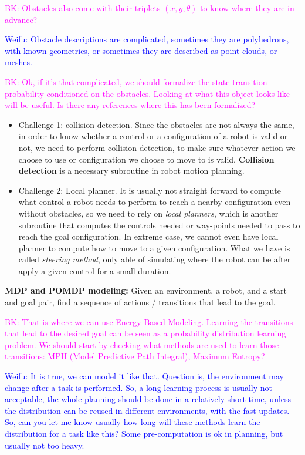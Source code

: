 \documentclass{article}
\begin{document}
\textcolor{magenta}{BK: Obstacles also come with their triplets $(x, y, \theta)$ to know where they are in advance?}

\textcolor{blue}{Weifu: Obstacle descriptions are complicated, sometimes they are polyhedrons, with known geometries, or sometimes they are described as point clouds, or meshes. }

\textcolor{magenta}{BK: Ok, if it's that complicated, we should formalize the state transition probability conditioned on the obstacles. Looking at what this object looks like will be useful. Is there any references where this has been formalized?}

\begin{itemize}
\item Challenge 1: collision detection. Since the obstacles are not always the same, in order to know whether a control or a configuration of a robot is valid or not, we need to perform collision detection, to make sure whatever action we choose to use or configuration we choose to move to is valid. \textbf{Collision detection} is a necessary subroutine in robot motion planning. 

\item Challenge 2: Local planner. It is usually not straight forward to compute what control a robot needs to perform to reach a nearby configuration even without obstacles, so we need to rely on {\em local planners}, which is another subroutine that computes the controls needed or way-points needed to pass to reach the goal configuration. 
In extreme case, we cannot even have local planner to compute how to move to a given configuration. What we have is called \emph{steering method}, only able of simulating where the robot can be after apply a given control for a small duration.
\end{itemize}

\noindent\textbf{MDP and POMDP modeling:} Given an environment, a robot, and a start and goal pair, find a sequence of actions / transitions that lead to the goal. 

\textcolor{magenta}{BK: That is where we can use Energy-Based Modeling. Learning the transitions that lead to the desired goal can be seen as a probability distribution learning problem.
We should start by checking what methods are used to learn those transitions: MPII (Model Predictive Path Integral), Maximum Entropy? }

\textcolor{blue}{Weifu: It is true, we can model it like that. Question is, the environment may change after a task is performed. So, a long learning process is usually not acceptable, the whole planning should be done in a relatively short time, unless the distribution can be reused in different environments, with the fast updates. So, can you let me know usually how long will these methods learn the distribution for a task like this? Some pre-computation is ok in planning, but usually not too heavy. }
\end{document}
